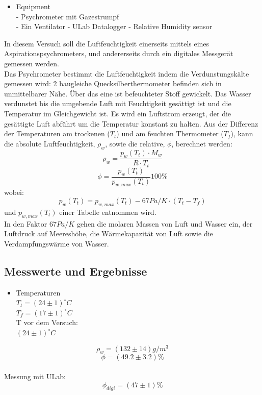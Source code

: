 \documentclass[12pt,a4paper]{article}
\begin{document}
\begin{multicols}{2}
\begin{itemize}
	\item Equipment\\
	- Psychrometer mit Gazestrumpf\\
	- Ein Ventilator
	- ULab Datalogger
	- Relative Humidity sensor
	
\end{itemize}

\noindent In diesem Versuch soll die Luftfeuchtigkeit einerseits mittels eines Aspirationspsychrometers, und andererseits durch ein digitales Messgerät gemessen werden.\\
Das Psychrometer bestimmt die Luftfeuchtigkeit indem die Verdunstungskälte gemessen wird: 2 baugleiche Quecksilberthermometer befinden sich in unmittelbarer Nähe. Über das eine ist befeuchteter Stoff gewickelt. Das Wasser verdunstet bis die umgebende Luft mit Feuchtigkeit gesättigt ist und die Temperatur im Gleichgewicht ist. Es wird ein Luftstrom erzeugt, der die gesättigte Luft abführt um die Temperatur konstant zu halten. Aus der Differenz der Temperaturen am trockenen ($T_t$) und am feuchten Thermometer ($T_f$), kann die absolute Luftfeuchtigkeit, $\rho_w$, sowie die relative, $\phi$, berechnet werden:\\
$$\rho_w=\frac{p_w(T_t)\cdot M_w}{R \cdot T_t}$$
$$\phi= \frac{p_w(T_t)}{p_{w,max}(T_t)}100\%$$
wobei:
$$p_w(T_t)=p_{w,max}(T_t)-67 Pa/K \cdot (T_t-T_f)$$
und $p_{w,max}(T_t)$ einer Tabelle entnommen wird.\\
In den Faktor $67Pa/K$ gehen die molaren Massen von Luft und Wasser ein, der Luftdruck auf Meereshöhe, die Wärmekapazität von Luft sowie die Verdampfungswärme von Wasser.

\subsection{Messwerte und Ergebnisse}
\begin {itemize}
	\item Temperaturen\\
	$T_{t} = (24 \pm 1)^{\circ}C$\\
	$T_{f} = (17 \pm 1)^{\circ}C$\\
	T vor dem Versuch:\\
	$(24 \pm 1)^{\circ}C$\\
\end{itemize}

$$\rho_w= (132 \pm 14)g/m^3$$
$$\phi =(49.2\pm 3.2)\%$$
\\
Messung mit ULab:
$$\phi_{digi}=(47 \pm 1)\%$$


\end{multicols}
\end{document}
